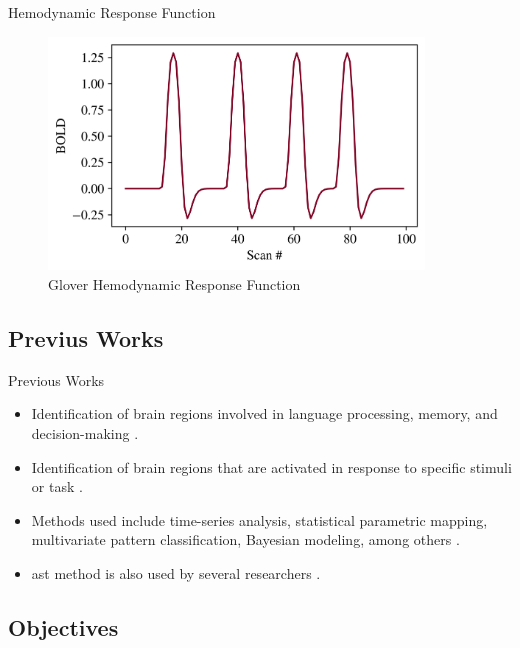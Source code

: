 \documentclass{beamer}
\begin{document}
\begin{frame}{Hemodynamic Response Function}
\begin{figure}
\centering
\includegraphics[width=0.89\textwidth]{images/gloverHRF.png}
\caption{Glover Hemodynamic Response Function}
\end{figure}
\end{frame}

\subsection{Previus Works}

\begin{frame}{Previous Works}
\begin{itemize}
\item Identification of brain regions involved in language processing, memory, and 
decision-making \cite{gaillard2003developmental,golby2005memory,heekeren2003fmri}.
\item Identification of brain regions that are activated in response to specific 
stimuli or task \cite{orchard2003simultaneous, deneux2006using, ardekani1999activation}.
\item Methods used include time-series analysis, statistical parametric mapping, 
multivariate pattern classification, Bayesian modeling, among others 
\cite{adrian2018complex, marchini2004comparing, mumford2012deconvolving, makni2008fully}.
\item \gls{ast} method is also used by several researchers 
\cite{tabelow2006analyzing, lindquist2010adaptive, strappini2017adaptive,almodovar2019fast}.
\end{itemize}

\end{frame}

\subsection{Objectives}
\end{document}
